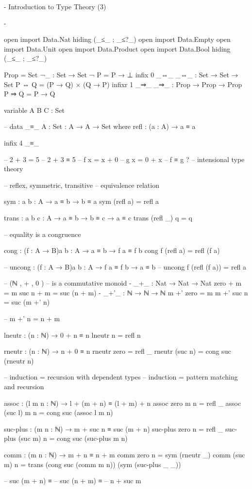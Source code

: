 {-
Introduction to Type Theory (3)

-}

open import Data.Nat hiding (_≤_ ; _≤?_)
open import Data.Empty 
open import Data.Unit 
open import Data.Product
open import Data.Bool hiding (_≤_ ; _≤?_)

Prop = Set
¬_ : Set → Set
¬ P = P → ⊥
infix 0 _⇔_
_⇔_ : Set → Set → Set
P ⇔ Q = (P → Q) × (Q → P)
infixr 1 _⇒_
_⇒_ : Prop → Prop → Prop
P ⇒ Q = P → Q

variable A B C : Set

-- \equiv
data _≡_ {A : Set} : A → A → Set where
    refl : (a : A) → a ≡ a

infix 4 _≡_

-- 2 + 3 = 5
-- 2 + 3 ≡ 5
-- f x = x + 0
-- g x = 0 + x
-- f ≡ g ?
-- intensional type theory

-- reflex, symmetric, transitive
-- equivalence relation

sym : {a b : A} → a ≡ b → b ≡ a
sym (refl a) = refl a

trans : {a b c : A} → a ≡ b → b ≡ c → a ≡ c
trans (refl _) q = q

-- equality is a congruence

cong : (f : A → B){a b : A} → a ≡ b → f a ≡ f b
cong f (refl a) = refl (f a)

-- uncong : (f : A → B){a b : A} → f a ≡ f b → a ≡ b
-- uncong f (refl (f a)) = refl a

-- (ℕ , + , 0 ) \bN 
-- is a commutative monoid
{-
_+_ : Nat → Nat → Nat
zero  + m = m
suc n + m = suc (n + m)
-} 
_+'_ : ℕ → ℕ → ℕ
m +' zero = m
m +' suc n = suc (m +' n)

-- m +' n = n + m

lneutr : (n : ℕ) → 0 + n ≡ n
lneutr n = refl n

rneutr : (n : ℕ) → n + 0 ≡ n
rneutr zero = refl _
rneutr (suc n) = cong suc (rneutr n)

-- induction = recursion with dependent types
-- induction = pattern matching and recursion

assoc : (l m n : ℕ) → l + (m + n) ≡ (l + m) + n
assoc zero m n = refl _
assoc (suc l) m n = cong suc (assoc l m n)

suc-plus : (m n : ℕ) → m + suc n ≡ suc (m + n)
suc-plus zero n = refl _
suc-plus (suc m) n = cong suc (suc-plus m n)

comm : (m n : ℕ) → m + n ≡ n + m
comm zero n = sym (rneutr _)
comm (suc m) n = trans (cong suc (comm m n)) (sym (suc-plus _ _))

-- suc (m + n) ≡ 
-- suc (n + m) ≡
-- n + suc m

